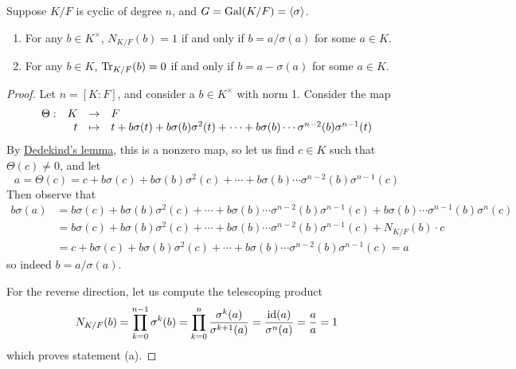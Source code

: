 \begin{theorem}
    Suppose \(K/F\) is cyclic of degree \(n\), and \(G = \operatorname{Gal}(K/F) = \langle\sigma\rangle\).
    \begin{enumerate}[label={(\alph*)}, itemsep=0mm]
        \item For any \(b \in K^\times\), \(N_{K/F}(b) = 1\) if and only if \(b = a/\sigma(a)\) for some \(a \in K\).
        \item For any \(b \in K\), \(\Tr_{K/F}(b) = 0\) if and only if \(b = a - \sigma(a)\) for some \(a \in K\).
    \end{enumerate}
\end{theorem}
\begin{proof}
    Let \(n = [K:F]\), and consider a \(b \in K^\times\) with norm 1.
    Consider the map
    \[\begin{array}{rrcl} {\Theta}: & {K} &\to & {F} \\ & {t} &\mapsto & {t + b\sigma(t) + b\sigma(b)\sigma^2(t) + \cdots + b\sigma(b)\cdots\sigma^{n-2}(b)\sigma^{n-1}(t)} \end{array}\]
    By \hyperref[lem:dedekind]{Dedekind's lemma}, this is a nonzero map,
    so let us find \(c \in K\) such that \(\Theta(c) \neq 0\), and let
    \[a = \Theta(c) = c + b\sigma(c) + b\sigma(b)\sigma^2(c) + \cdots + b\sigma(b)\cdots\sigma^{n-2}(b)\sigma^{n-1}(c)\]
    Then observe that
    \begin{align*}
        b\sigma(a) &= b\sigma(c) + b\sigma(b)\sigma^2(c) + \cdots + b\sigma(b)\cdots\sigma^{n-2}(b)\sigma^{n-1}(c) + b\sigma(b)\cdots\sigma^{n-1}(b)\sigma^n(c) \\
        &= b\sigma(c) + b\sigma(b)\sigma^2(c) + \cdots + b\sigma(b)\cdots\sigma^{n-2}(b)\sigma^{n-1}(c) + N_{K/F}(b) \cdot c \\
        &= c + b\sigma(c) + b\sigma(b)\sigma^2(c) + \cdots + b\sigma(b)\cdots\sigma^{n-2}(b)\sigma^{n-1}(c)
        = a
    \end{align*}
    so indeed \(b = a/\sigma(a)\).
    
    For the reverse direction, let us compute the telescoping product
    \begin{equation*}
        N_{K/F}(b) = \prod_{k=0}^{n-1} \sigma^k(b) = \prod_{k=0}^n \frac{\sigma^k(a)}{\sigma^{k+1}(a)}
        = \frac{\operatorname{id}(a)}{\sigma^n(a)} = \frac{a}{a} = 1
    \end{equation*}
    which proves statement (a).
    
    \medskip
    

\end{proof}
